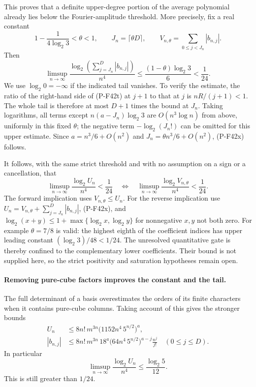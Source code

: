 \documentclass[11pt,a4paper]{article}
\begin{document}
This proves that a definite upper-degree portion of the
average polynomial already lies below the Fourier-amplitude
threshold. More precisely, fix a real constant
\[
 1-\frac1{4\log_2 3}<\theta<1,
 \qquad J_n=\lceil\theta D\rceil,
 \qquad V_{n,\theta}=\sum_{0\le j<J_n}|b_{n,j}|.
 \tag{P-F42w}
\]
Then
\[
 \limsup_{n\to\infty}
 \frac{\log_2\left(\sum_{j=J_n}^{D}|b_{n,j}|\right)}{n^4}
 \le \frac{(1-\theta)\log_2 3}{6}<\frac1{24}.
 \tag{P-F42x}
\]
We use \(\log_2 0=-\infty\) if the indicated tail vanishes.
To verify the estimate, the ratio of the right-hand side
of (P-F42t) at \(j+1\) to that at \(j\) is
\(nR/(j+1)<1\).
The whole tail is therefore at most \(D+1\) times
the bound at \(J_n\). Taking logarithms,
all terms except \(n(a-J_n)\log_2 3\) are
\(O(n^3\log n)\) from above, uniformly in this fixed
\(\theta\); the negative term \(-\log_2(J_n!)\)
can be omitted for this upper estimate.
Since \(a=n^3/6+O(n^2)\) and
\(J_n=\theta n^3/6+O(n^2)\), (P-F42x) follows.

It follows, with the same strict threshold and with no
assumption on a sign or a cancellation, that
\[
 \limsup_{n\to\infty}\frac{\log_2 U_n}{n^4}<\frac1{24}
 \quad\Longleftrightarrow\quad
 \limsup_{n\to\infty}
        \frac{\log_2 V_{n,\theta}}{n^4}<\frac1{24}.
 \tag{P-F42y}
\]
The forward implication uses \(V_{n,\theta}\le U_n\).
For the reverse implication use
\(U_n=V_{n,\theta}+\sum_{j=J_n}^D|b_{n,j}|\),
(P-F42x), and
\(\log_2(x+y)\le1+\max\{\log_2x,\log_2y\}\)
for nonnegative \(x,y\) not both zero.
For example \(\theta=7/8\) is valid: the highest eighth
of the coefficient indices has upper leading constant
\((\log_2 3)/48<1/24\). The unresolved quantitative
gate is thereby confined to the complementary lower
coefficients. Their bound is not supplied here, so the
strict positivity and saturation hypotheses remain open.

\paragraph{Removing pure-cube factors improves the constant and the tail.}
The full determinant of a basis overestimates the orders of
its finite characters when it contains pure-cube columns.
Taking account of this gives the stronger bounds
\[
 \begin{split}
 U_n&\le8n!\,m^{3n}
        \bigl(1152n^4\,5^{n/2}\bigr)^a,\\
 |b_{n,j}|&\le8n!\,m^{3n}\,18^a
        \bigl(64n^4\,5^{n/2}\bigr)^{a-j}
                       \frac{n^j}{j!}
                 \quad(0\le j\le D).
 \end{split}
 \tag{P-F42z}
\]
In particular
\[
 \limsup_{n\to\infty}\frac{\log_2 U_n}{n^4}
             \le\frac{\log_2 5}{12}.
 \tag{P-F42aa}
\]
This is still greater than \(1/24\).
\end{document}
